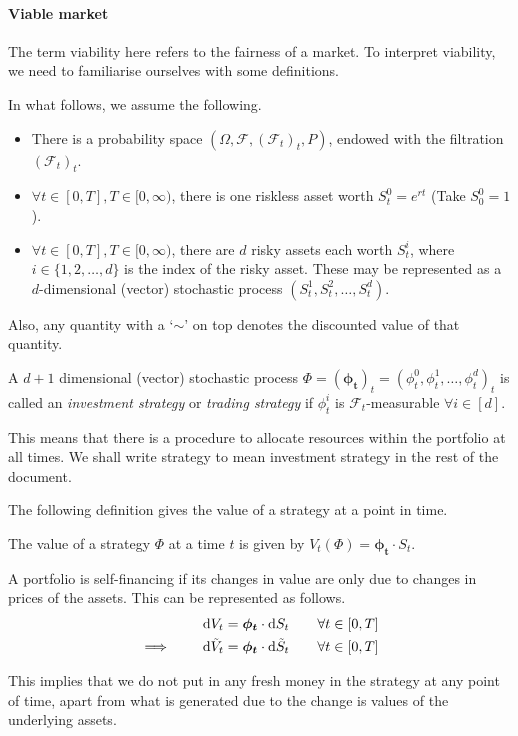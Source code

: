 \paragraph{Viable market}
The term viability here refers to the fairness of a market. To interpret viability, we need to familiarise ourselves with some definitions.

In what follows, we assume the following.
\begin{itemize}
	\item There is a probability space $ (\Omega, \mathcal{F}, (\mathcal{F}_t)_t, P) $, endowed with the filtration $ (\mathcal{F}_t)_t $.
	\item $ \forall t \in [0, T], T \in [0, \infty) $, there is one riskless asset worth $ S_t^0 = e^{rt} $ (Take $ S_0^0 = 1 $).
	\item $ \forall t \in [0, T], T \in [0, \infty) $, there are $ d $ risky assets each worth $ S_t^i $, where $ i \in \{ 1, 2, \dots, d \} $ is the index of the risky asset. These may be represented as a $ d $-dimensional (vector) stochastic process $ ( S_t^1, S_t^2, \dots, S_t^d ) $.
\end{itemize}

Also, any quantity with a `$ \sim $' on top denotes the discounted value of that quantity.


\begin{dfn}
	A $ d + 1 $ dimensional (vector) stochastic process $ \Phi = (\bm{\phi_t})_t = (\phi_t^0, \phi_t^1, \dots, \phi_t^d)_t $ is called an \emph{investment strategy} or \emph{trading strategy} if $ \phi_t^i $ is $ \mathcal{F}_t $-measurable $ \forall i \in [d] $.
\end{dfn}
This means that there is a procedure to allocate resources within the portfolio at all times. We shall write strategy to mean investment strategy in the rest of the document.

The following definition gives the value of a strategy at a point in time.
\begin{dfn}
	The value of a strategy $ \Phi $ at a time $ t $ is given by $ V_t( \Phi ) = \bm{\phi_t} \cdot S_t $.
\end{dfn}

\begin{dfn}
	A portfolio is self-financing if its changes in value are only due to changes in prices of the assets. This can be represented as follows.
	\begin{subequations}
		\begin{align}
			\dif V_t &= \bm{\phi_t} \cdot \dif S_t \qquad \forall t \in [0, T]  \\
			\implies  \qquad  \dif \tilde{V}_t &= \bm{\phi_t} \cdot \dif \tilde{S}_t \qquad \forall t \in [0, T]
		\end{align}
	\end{subequations}
\end{dfn}
This implies that we do not put in any fresh money in the strategy at any point of time, apart from what is generated due to the change is values of the underlying assets.

